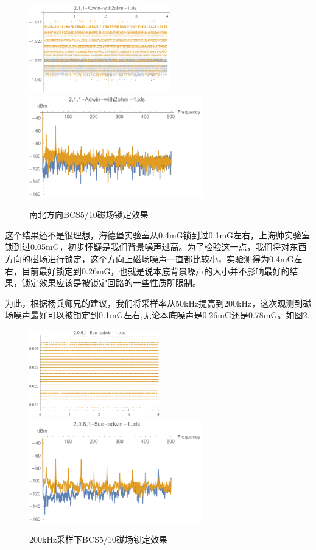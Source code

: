 \documentclass[onecolumn,a4paper,10pt]{article}
\begin{document}
\begin{figure}[htbp]
\centering
\includegraphics[height=1.5in]{20160428adwinSNdata}%
\hspace{0.4in}%
\includegraphics[height=1.75in]{20160428adwinSN}
\caption{南北方向BCS5/10磁场锁定效果}
\label{fig:1092}
\end{figure}

这个结果还不是很理想，海德堡实验室从0.4mG锁到过0.1mG左右，上海帅实验室锁到过0.05mG，初步怀疑是我们背景噪声过高。为了检验这一点，我们将对东西方向的磁场进行锁定，这个方向上磁场噪声一直都比较小，实验测得为0.4mG左右，目前最好锁定到0.26mG，也就是说本底背景噪声的大小并不影响最好的结果，锁定效果应该是被锁定回路的一些性质所限制。

为此，根据杨兵师兄的建议，我们将采样率从50kHz提高到200kHz，这次观测到磁场噪声最好可以被锁定到0.1mG左右,无论本底噪声是0.26mG还是0.78mG。如图\ref{fig:1093}.

\begin{figure}[htbp]
\centering
\includegraphics[height=1.5in]{20160429adwinEWdata}%
\hspace{0.4in}%
\includegraphics[height=1.75in]{20160429adwinEW}
\caption{200kHz采样下BCS5/10磁场锁定效果}
\label{fig:1093}
\end{figure}
\end{document}
